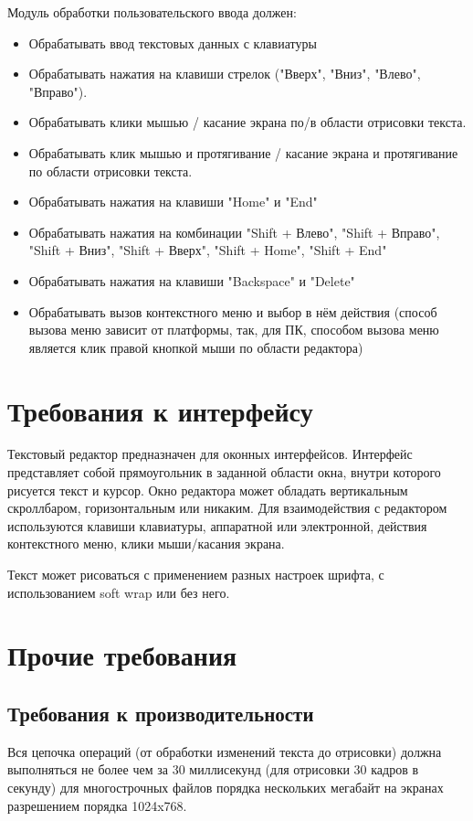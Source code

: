 \documentclass{fefu}
\begin{document}
		\par Модуль обработки пользовательского ввода должен:
		\begin{itemize}
			\item Обрабатывать ввод текстовых данных с клавиатуры
			\item Обрабатывать нажатия на клавиши стрелок 
			("Вверх", "Вниз", "Влево", "Вправо").
			\item Обрабатывать клики мышью / касание экрана по/в области отрисовки текста.
			\item Обрабатывать клик мышью и протягивание / касание экрана и протягивание по 
			области отрисовки текста.
			\item Обрабатывать нажатия на клавиши "Home" и "End"
			\item Обрабатывать нажатия на комбинации "Shift + Влево", "Shift + Вправо", 
			"Shift + Вниз", "Shift + Вверх", "Shift + Home", "Shift + End"
			\item Обрабатывать нажатия на клавиши "Backspace" и "Delete"
			\item Обрабатывать вызов контекстного меню и выбор в нём действия (способ вызова
			меню зависит от платформы, так, для ПК, способом вызова меню является клик правой
			кнопкой мыши по области редактора)
		\end{itemize}
	\section{Требования к интерфейсу}
		\par Текстовый редактор предназначен для оконных интерфейсов. Интерфейс представляет
		собой прямоугольник в заданной области окна, внутри которого рисуется текст и курсор. Окно редактора может обладать 
		вертикальным скроллбаром, горизонтальным или никаким. Для взаимодействия с редактором
		используются клавиши клавиатуры, 
		аппаратной или электронной, действия контекстного меню, клики мыши/касания экрана.
		\par Текст может рисоваться с применением разных настроек шрифта, с использованием soft
		wrap или без него.
	\section{Прочие требования}
		\subsection{Требования к производительности}
			Вся цепочка операций (от обработки изменений текста до 
			отрисовки) должна выполняться не более чем за 30 миллисекунд (для отрисовки 30 
			кадров в секунду) для многострочных файлов порядка нескольких мегабайт на экранах
			разрешением порядка 1024x768. %
\end{document}
